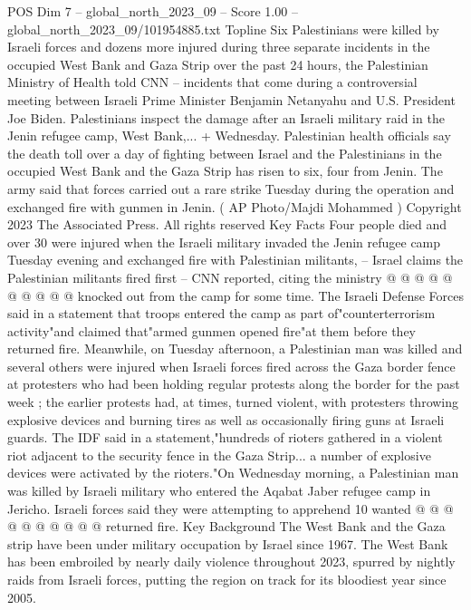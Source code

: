 \begin{textsample}{POS Dim 7 – global\_north\_2023\_09 – Score 1.00 – global\_north\_2023\_09/101954885.txt}  \label{ex:f7_pos_374}
Topline Six Palestinians were killed by Israeli forces and dozens more injured during three separate incidents in the occupied West Bank and Gaza Strip over the past 24 hours, the Palestinian Ministry of Health told CNN -- incidents that come during a controversial meeting between Israeli Prime Minister Benjamin Netanyahu and U.S.
President Joe Biden.
Palestinians inspect the damage after an Israeli military raid in the Jenin refugee camp, West Bank,... + Wednesday.
Palestinian health officials say the death toll over a day of fighting between Israel and the Palestinians in the occupied West Bank and the Gaza Strip has risen to six, four from Jenin.
The army said that forces carried out a rare strike Tuesday during the operation and exchanged fire with gunmen in Jenin. ( AP Photo/Majdi Mohammed ) Copyright 2023 The Associated Press.
All rights reserved Key Facts Four people died and over 30 were injured when the Israeli military invaded the Jenin refugee camp Tuesday evening and exchanged fire with Palestinian militants, -- Israel claims the Palestinian militants fired first -- CNN reported, citing the ministry @ @ @ @ @ @ @ @ @ @ knocked out from the camp for some time.
The Israeli Defense Forces said in a statement that troops entered the camp as part of"counterterrorism activity"and claimed that"armed gunmen opened fire"at them before they returned fire.
Meanwhile, on Tuesday afternoon, a Palestinian man was killed and several others were injured when Israeli forces fired across the Gaza border fence at protesters who had been holding regular protests along the border for the past week ; the earlier protests had, at times, turned violent, with protesters throwing explosive devices and burning tires as well as occasionally firing guns at Israeli guards.
The IDF said in a statement,"hundreds of rioters gathered in a violent riot adjacent to the security fence in the Gaza Strip... a number of explosive devices were activated by the rioters."On Wednesday morning, a Palestinian man was killed by Israeli military who entered the Aqabat Jaber refugee camp in Jericho.
Israeli forces said they were attempting to apprehend 10 wanted @ @ @ @ @ @ @ @ @ @ returned fire.
Key Background The West Bank and the Gaza strip have been under military occupation by Israel since 1967.
The West Bank has been embroiled by nearly daily violence throughout 2023, spurred by nightly raids from Israeli forces, putting the region on track for its bloodiest year since 2005.

\end{textsample}
